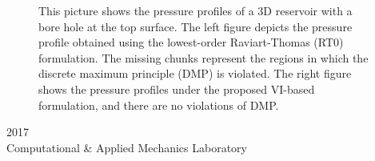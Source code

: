 \documentclass[11pt,reqno]{amsproc}
\numberwithin{equation}{section}
\begin{document}
\begin{titlepage}
\begin{figure}[h]
   	\captionsetup{format=hang}
	\vspace{-0.15in}
   	\caption*{\small{This picture shows the pressure profiles 
	of a 3D reservoir with a bore hole at the top surface. The 
	left figure depicts the pressure profile obtained using the 
	lowest-order Raviart-Thomas (RT0) formulation. The 
	missing chunks represent the regions in which the 
	discrete maximum principle (DMP) is violated. The 
	right figure shows the pressure profiles under the 
	proposed VI-based formulation, and there are no 
	violations of DMP.}}
   \end{figure}
    \vfill
    {\scshape 2017} \\
    {\small Computational \& Applied Mechanics Laboratory} \par
\end{titlepage}
\end{document}
